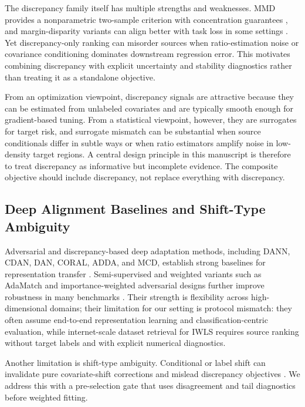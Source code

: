 \documentclass{article} %
\begin{document}
The discrepancy family itself has multiple strengths and weaknesses. MMD provides a nonparametric two-sample criterion with concentration guarantees \citep{Gretton2012MMD}, and margin-disparity variants can align better with task loss in some settings \citep{Zhang2019MDD}. Yet discrepancy-only ranking can misorder sources when ratio-estimation noise or covariance conditioning dominates downstream regression error. This motivates combining discrepancy with explicit uncertainty and stability diagnostics rather than treating it as a standalone objective.

From an optimization viewpoint, discrepancy signals are attractive because they can be estimated from unlabeled covariates and are typically smooth enough for gradient-based tuning. From a statistical viewpoint, however, they are surrogates for target risk, and surrogate mismatch can be substantial when source conditionals differ in subtle ways or when ratio estimators amplify noise in low-density target regions. A central design principle in this manuscript is therefore to treat discrepancy as informative but incomplete evidence. The composite objective should include discrepancy, not replace everything with discrepancy.

\subsection{Deep Alignment Baselines and Shift-Type Ambiguity}
Adversarial and discrepancy-based deep adaptation methods, including DANN, CDAN, DAN, CORAL, ADDA, and MCD, establish strong baselines for representation transfer \citep{Ganin2016DANN,Long2018CDAN,Long2015DAN,Sun2016DeepCORAL,Tzeng2017ADDA,Saito2018MCD}. Semi-supervised and weighted variants such as AdaMatch and importance-weighted adversarial designs further improve robustness in many benchmarks \citep{Berthelot2022AdaMatch,Li2020IWCA}. Their strength is flexibility across high-dimensional domains; their limitation for our setting is protocol mismatch: they often assume end-to-end representation learning and classification-centric evaluation, while internet-scale dataset retrieval for IWLS requires source ranking without target labels and with explicit numerical diagnostics.

Another limitation is shift-type ambiguity. Conditional or label shift can invalidate pure covariate-shift corrections and mislead discrepancy objectives \citep{Combes2020ConditionalShift}. We address this with a pre-selection gate that uses disagreement and tail diagnostics before weighted fitting.
\end{document}
